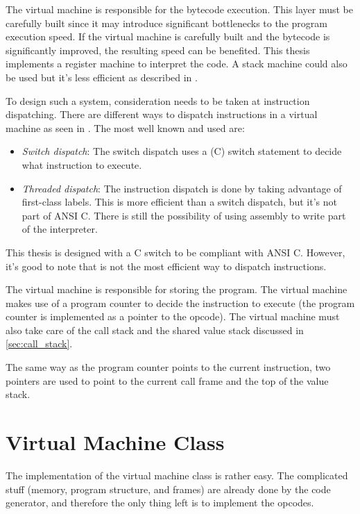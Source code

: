 The virtual machine is responsible for the bytecode execution. This layer must be
carefully built since it may introduce significant bottlenecks to the program execution speed.
If the virtual machine is carefully built and the bytecode is significantly improved, the
resulting speed can be benefited. This thesis implements a register machine to interpret the code.
A stack machine could also be used but it's less efficient as described in \autocite{stack_vs_register}.

To design such a system, consideration needs to be taken at instruction dispatching. There are different ways
to dispatch instructions in a virtual machine as seen in \autocite{stack_vs_register}. The most well known and used are:

\begin{itemize}
    \item \emph{Switch dispatch}: The switch dispatch uses a (C) switch statement to decide what instruction to execute.
    \item \emph{Threaded dispatch}: The instruction dispatch is done by taking advantage of first-class labels. This is more efficient than
        a switch dispatch, but it's not part of ANSI C. There is still the possibility of using assembly to write part of the interpreter.
\end{itemize}

This thesis is designed with a C switch to be compliant with ANSI C. However, it's good to note that is not the most efficient way to dispatch instructions.

The virtual machine is responsible for storing the program. The virtual machine makes use of a program counter to decide the instruction to execute
(the program counter is implemented as a pointer to the opcode). The virtual machine must also take care of the call stack and the shared value
stack discussed in \autoref{sec:call_stack}.

The same way as the program counter points to the current instruction, two pointers are used to point to the current call frame and the top of the value stack.

\section{Virtual Machine Class}

The implementation of the virtual machine class is rather easy. The complicated stuff (memory, program structure, and frames) are already done by the
code generator, and therefore the only thing left is to implement the opcodes.

